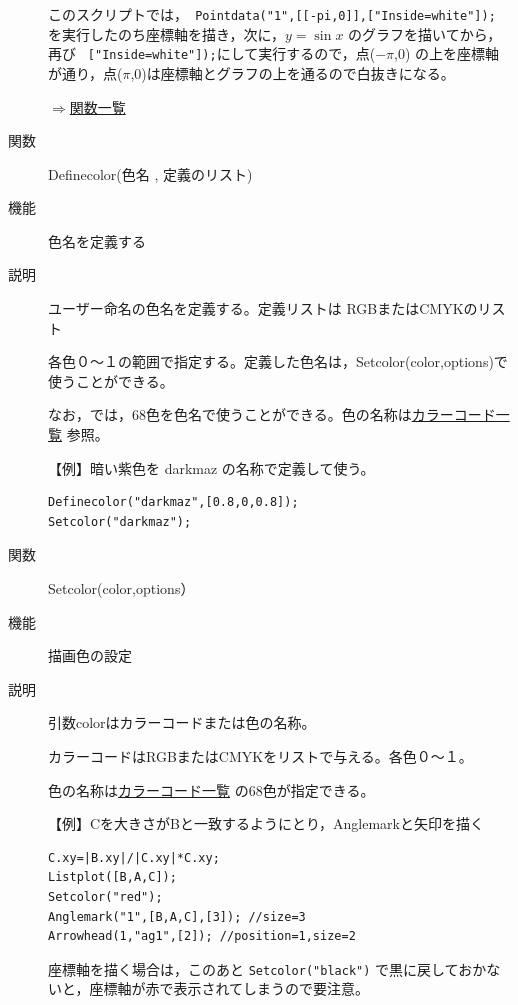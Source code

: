 \documentclass[papersize,a4paper,10pt,uplatex]{jsarticle}
\begin{document}
\begin{description}
このスクリプトでは，\verb| Pointdata("1",[[-pi,0]],["Inside=white"]);| を実行したのち座標軸を描き，次に，$y=\sin x$ のグラフを描いてから，再び \verb| ["Inside=white"]);|にして実行するので，点($-\pi$,0) の上を座標軸が通り，点($\pi$,0)は座標軸とグラフの上を通るので白抜きになる。

\begin{flushright}\hyperlink{functionlist}{$\Rightarrow$関数一覧}\end{flushright}

\vspace{\baselineskip}
\hypertarget{definecolor}{}
\item[関数]Definecolor(色名 , 定義のリスト)
\item[機能]色名を定義する
\item[説明]ユーザー命名の色名を定義する。定義リストは RGBまたはCMYKのリスト

各色０〜１の範囲で指定する。定義した色名は，Setcolor(color,options)で使うことができる。

なお，\ketcindy では，68色を色名で使うことができる。色の名称は\hyperlink{colorcodelist}{カラーコード一覧} 参照。

\vspace{\baselineskip}
【例】暗い紫色を darkmaz の名称で定義して使う。
\begin{verbatim}
Definecolor("darkmaz",[0.8,0,0.8]);
Setcolor("darkmaz");
\end{verbatim}


\vspace{\baselineskip}
\hypertarget{setcolor}{}
\item[関数]Setcolor(color,options）
\item[機能]描画色の設定
\item[説明]引数colorはカラーコードまたは色の名称。

カラーコードはRGBまたはCMYKをリストで与える。各色０〜１。

色の名称は\hyperlink{colorcodelist}{カラーコード一覧} の68色が指定できる。


\vspace{\baselineskip}
【例】Cを大きさがBと一致するようにとり，Anglemarkと矢印を描く
\begin{verbatim}
C.xy=|B.xy|/|C.xy|*C.xy;
Listplot([B,A,C]);
Setcolor("red");
Anglemark("1",[B,A,C],[3]); //size=3
Arrowhead(1,"ag1",[2]); //position=1,size=2
\end{verbatim}

座標軸を描く場合は，このあと \verb|Setcolor("black")| で黒に戻しておかないと，座標軸が赤で表示されてしまうので要注意。



\end{description}
\end{document}
